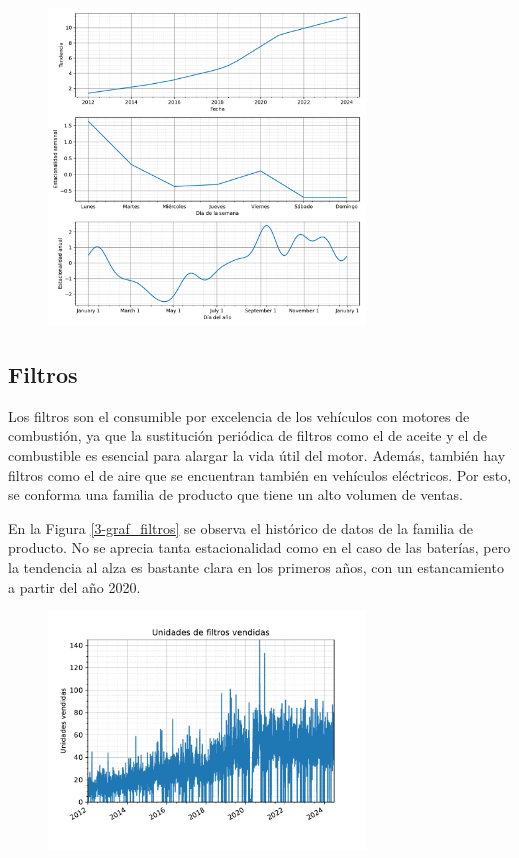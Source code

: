 \begin{figure}[H]
	{\includegraphics[width=0.75\textwidth]{imagenes/comps_baterias.pdf}}
\end{figure}


\subsection{Filtros}

Los filtros son el consumible por excelencia de los vehículos con motores de combustión, ya que la sustitución periódica de filtros como el de aceite y el de combustible es esencial para alargar la vida útil del motor. Además, también hay filtros como el de aire que se encuentran también en vehículos eléctricos. Por esto, se conforma una familia de producto que tiene un alto volumen de ventas.

En la Figura \ref*{3-graf_filtros} se observa el histórico de datos de la familia de producto. No se aprecia tanta estacionalidad como en el caso de las baterías, pero la tendencia al alza es bastante clara en los primeros años, con un estancamiento a partir del año 2020.

\begin{figure}[H]
	{\includegraphics[width=0.75\textwidth]{imagenes/grafica_filtros.pdf}}
\end{figure}

